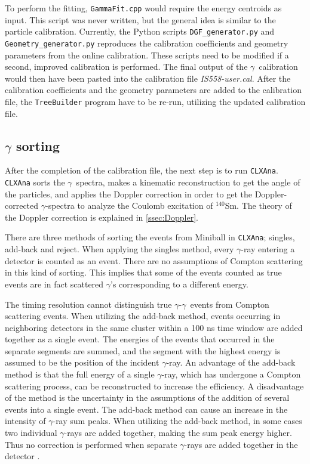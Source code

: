 \documentclass[twoside,english]{uiofysmaster/uiofysmaster}
\newcommand{\Sm}{$^{140}$Sm} %
\newcommand{\ga}{$\gamma$}
\let\orgautoref\autoref
\renewcommand{\autoref}
        {%
		 \def\sectionautorefname{Section}%
		 \def\subsectionautorefname{Section}%
		 \def\subsubsectionautorefname{Section}%
		 \def\chapterautorefname{Chapter}%
          \orgautoref}
\begin{document}
To perform the fitting, \texttt{GammaFit.cpp} would require the energy centroids as input. 
This script was never written, but the general idea is similar to the particle calibration.
Currently, the Python scripts \texttt{DGF\_generator.py} and \texttt{Geometry\_generator.py} reproduces the calibration coefficients and geometry parameters from the online calibration. 
These scripts need to be modified if a second, improved calibration is performed.
The final output of the \ga\ calibration would then have been pasted into the calibration file \textit{IS558-user.cal}.
After the calibration coefficients and the geometry parameters are added to the calibration file, the \texttt{TreeBuilder} program have to be re-run, utilizing the updated calibration file.



\subsection{\texorpdfstring{$\gamma$}{gamma} sorting}
After the completion of the calibration file, the next step is to run \texttt{CLXAna}.
\texttt{CLXAna} sorts the \ga\ spectra, makes a kinematic reconstruction to get the angle of the particles, and applies the Doppler correction in order to get the Doppler-corrected \ga-spectra to analyze the Coulomb excitation of \Sm.
The theory of the Doppler correction is explained in \autoref{ssec:Doppler}.

There are three methods of sorting the events from Miniball in \texttt{CLXAna}; singles, add-back and reject. 
When applying the singles method, every \ga-ray entering a detector is counted as an event.
There are no assumptions of Compton scattering in this kind of sorting. 
This implies that some of the events counted as true events are in fact scattered \ga's corresponding to a different energy.

The timing resolution cannot distinguish true \ga-\ga\ events from Compton scattering events.
When utilizing the add-back method, events occurring in neighboring detectors in the same cluster within a 100 ns time window are added together as a single event. 
The energies of the events that occurred in the separate segments are summed, and the segment with the highest energy is assumed to be the position of the incident \ga-ray.
An advantage of the add-back method is that the full energy of a single \ga-ray, which has undergone a Compton scattering process, can be reconstructed to increase the efficiency.
A disadvantage of the method is the uncertainty in the assumptions of the addition of several events into a single event. 
The add-back method can cause an increase in the intensity of \ga-ray sum peaks.
When utilizing the add-back method, in some cases two individual \ga-rays are added together, making the sum peak energy higher.
Thus no correction is performed when separate \ga-rays are added together in the detector \cite{Gaffney, MB-spect}.
\end{document}
